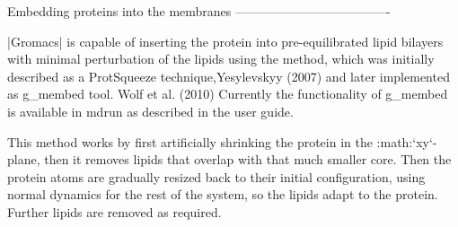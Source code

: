 Embedding proteins into the membranes
-------------------------------------

|Gromacs| is capable of inserting the protein into pre-equilibrated lipid
bilayers with minimal perturbation of the lipids using the method, which
was initially described as a ProtSqueeze technique,Yesylevskyy (2007)
and later implemented as g_membed tool. Wolf et al. (2010) Currently the
functionality of g_membed is available in mdrun as described in the
user guide.

This method works by first artificially shrinking the protein in the
:math:`xy`-plane, then it removes lipids that overlap with that much
smaller core. Then the protein atoms are gradually resized back to their
initial configuration, using normal dynamics for the rest of the system,
so the lipids adapt to the protein. Further lipids are removed as
required.

